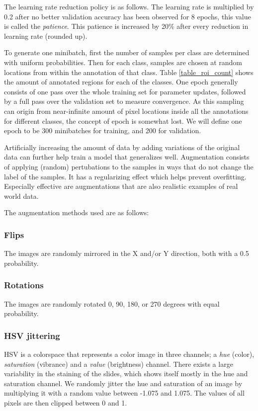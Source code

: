\documentclass[journal]{IEEEtran}
\begin{document}
The learning rate reduction policy is as follows. The learning rate is multiplied by 0.2 after no better validation accuracy has been observed for 8 epochs, this value is called the \emph{patience}. This patience is increased by 20\% after every reduction in learning rate (rounded up).  

To generate one minibatch, first the number of samples per class are determined with uniform probabilities. Then for each class, samples are chosen at random locations from within the annotation of that class. Table \ref{table_roi_count} shows the amount of annotated regions for each of the classes. One epoch generally consists of one pass over the whole training set for parameter updates, followed by a full pass over the validation set to measure convergence. As this sampling can origin from near-infinite amount of pixel locations inside all the annotations for different classes, the concept of epoch is somewhat lost. We will define one epoch to be 300 minibatches for training, and 200 for validation. 

Artificially increasing the amount of data by adding variations of the original data can further help train a model that generalizes well. Augmentation consists of applying (random) pertubations to the samples in ways that do not change the label of the samples. It has a regularizing effect which helps prevent overfitting. Especially effective are augmentations that are also realistic examples of real world data.

\medskip

The augmentation methods used are as follows:

\subsubsection{Flips}
The images are randomly mirrored in the X and/or Y direction, both with a 0.5 probability. 

\subsubsection{Rotations}
The images are randomly rotated 0, 90, 180, or 270 degrees with equal probability.

\subsubsection{HSV jittering}
HSV is a colorspace that represents a color image in three channels; a \emph{hue} (color), \emph{saturation} (vibrance) and a \emph{value} (brightness) channel. There exists a large variability in the staining of the slides, which shows itself mostly in the hue and saturation channel. We randomly jitter the hue and saturation of an image by multiplying it with a random value between -1.075 and 1.075. The values of all pixels are then clipped between 0 and 1.
\end{document}
